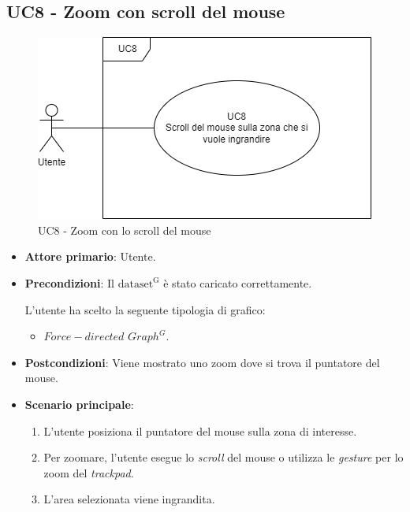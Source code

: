 \subsection{UC8 - Zoom con scroll del mouse}
\label{sec:UC8}
\begin{figure}[h!]
    \centering
    \includegraphics[scale=0.60]{../../assets/zoom_mouse.png}
    \caption{UC8 - Zoom con lo scroll del mouse}
\end{figure}
\begin{itemize}
    \item \textbf{Attore primario}: Utente.
    \item \textbf{Precondizioni}: Il ${\mathrm{dataset^{G}}}$ è stato caricato correttamente. \par L'utente ha scelto la seguente tipologia di grafico:
    \begin{itemize}
          \item $Force-directed$ $Graph^{G}$.
    \end{itemize}
    \item \textbf{Postcondizioni}: Viene mostrato uno zoom dove si trova il puntatore del mouse.
    \item \textbf{Scenario principale}:
          \begin{enumerate}
              \item L'utente posiziona il puntatore del mouse sulla zona di interesse.
              \item Per zoomare, l'utente esegue lo \textit{scroll} del mouse o utilizza le \textit{gesture} per lo zoom del \textit{trackpad}.
              \item L'area selezionata viene ingrandita.
          \end{enumerate}
\end{itemize}

\newpage

